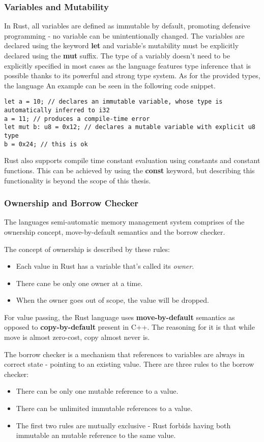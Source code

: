 \subsubsection{Variables and Mutability}
In Rust, all variables are defined as immutable by default, promoting defensive programming - no variable can be unintentionally changed.
The variables are declared using the keyword \textbf{let} and variable's mutability must be explicitly declared using the \textbf{mut} suffix.
The type of a variably doesn't need to be explicitly specified in most cases as the language features type inference that is possible thanks to its powerful and strong type system.
As for the provided types, the language
An example can be seen in the following code snippet.

\begin{lstlisting}
let a = 10; // declares an immutable variable, whose type is automatically inferred to i32
a = 11; // produces a compile-time error
let mut b: u8 = 0x12; // declares a mutable variable with explicit u8 type
b = 0x24; // this is ok
\end{lstlisting}

Rust also supports compile time constant evaluation using constants and constant functions.
This can be achieved by using the \textbf{const} keyword, but describing this functionality is beyond the scope of this thesis.

\subsubsection{Ownership and Borrow Checker}
The languages semi-automatic memory management system comprises of the ownership concept, move-by-default semantics and the borrow checker.

The concept of ownership is described by these rules\cite{rust_lang_book}:
\begin{itemize}
    \item Each value in Rust has a variable that's called its \textit{owner}.
    \item There cane be only one owner at a time.
    \item When the owner goes out of scope, the value will be dropped.
\end{itemize}
For value passing, the Rust language uses \textbf{move-by-default} semantics as opposed to \textbf{copy-by-default} present in C++.
The reasoning for it is that while move is almost zero-cost, copy almost never is.

The borrow checker is a mechanism that references to variables are always in correct state - pointing to an existing value.
There are three rules to the borrow checker:
\begin{itemize}
    \item There can be only one mutable reference to a value.
    \item There can be unlimited immutable references to a value.
    \item The first two rules are mutually exclusive - Rust forbids having both immutable an mutable reference to the same value.
\end{itemize}

